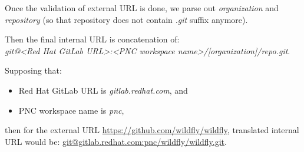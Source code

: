 \documentclass[../main.tex]{subfiles}
\begin{document}
Once the validation of external URL is done, we parse out \textit{organization} and \textit{repository} (so that repository does not contain \textit{.git} suffix anymore).

Then the final internal URL is concatenation of:\\
\textit{git@<Red Hat GitLab URL>:<PNC workspace name>/[organization]/repo.git}.

Supposing that:
\begin{itemize}
    \item Red Hat GitLab URL is \textit{gitlab.redhat.com}, and

    \item PNC workspace name is \textit{pnc},
\end{itemize}

then for the external URL \url{https://github.com/wildfly/wildfly}, translated internal URL would be: \url{git@gitlab.redhat.com:pnc/wildfly/wildfly.git}.
\end{document}
